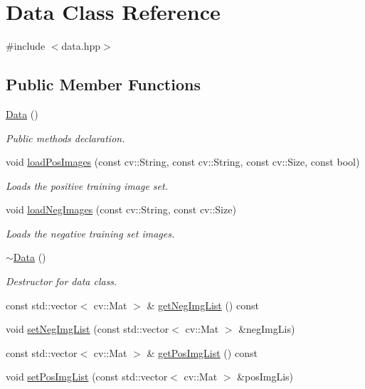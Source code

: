 \hypertarget{classData}{}\section{Data Class Reference}
\label{classData}


{\ttfamily \#include $<$data.\+hpp$>$}

\subsection*{Public Member Functions}
\begin{DoxyCompactItemize}
\item 
\hyperlink{classData_af11f741cb7f587e2e495452a8905a22a}{Data} ()
\begin{DoxyCompactList}\small\item\em Public methods declaration. \end{DoxyCompactList}\item 
void \hyperlink{classData_a30cb7a53ab253a2f7e477ac13fe4c3e3}{load\+Pos\+Images} (const cv\+::\+String, const cv\+::\+String, const cv\+::\+Size, const bool)
\begin{DoxyCompactList}\small\item\em Loads the positive training image set. \end{DoxyCompactList}\item 
void \hyperlink{classData_a7a9b971dd776aa4086174ea2704bacd5}{load\+Neg\+Images} (const cv\+::\+String, const cv\+::\+Size)
\begin{DoxyCompactList}\small\item\em Loads the negative training set images. \end{DoxyCompactList}\item 
\hyperlink{classData_aab31956423290f0d62dcca47ab4d16dd}{$\sim$\+Data} ()
\begin{DoxyCompactList}\small\item\em Destructor for data class. \end{DoxyCompactList}\item 
const std\+::vector$<$ cv\+::\+Mat $>$ \& \hyperlink{classData_a7d2fe8b20182b53ad41e12149cc90932}{get\+Neg\+Img\+List} () const 
\item 
void \hyperlink{classData_a0db1adf09415689d00c763d6bc9c1c19}{set\+Neg\+Img\+List} (const std\+::vector$<$ cv\+::\+Mat $>$ \&neg\+Img\+Lis)
\item 
const std\+::vector$<$ cv\+::\+Mat $>$ \& \hyperlink{classData_a20bed9baad2849686a4ffa2f92756a72}{get\+Pos\+Img\+List} () const 
\item 
void \hyperlink{classData_a00c7e030a3ef58b3ec5047b43afed9a2}{set\+Pos\+Img\+List} (const std\+::vector$<$ cv\+::\+Mat $>$ \&pos\+Img\+Lis)
\end{DoxyCompactItemize}


